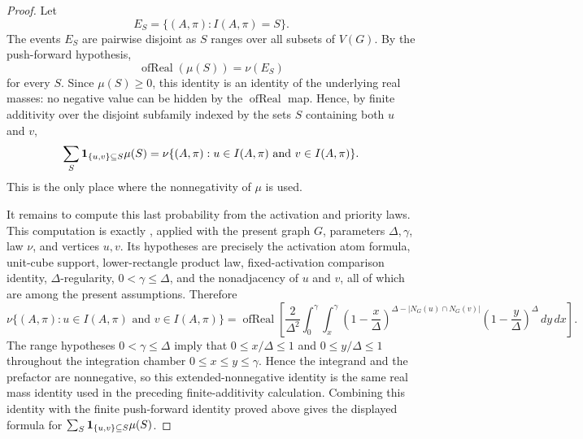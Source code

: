 \begin{proof}
Let
\[
E_S=\{(A,\pi): I(A,\pi)=S\}.
\]
The events \(E_S\) are pairwise disjoint as \(S\) ranges over all subsets of
\(V(G)\).  By the push-forward hypothesis,
\[
\operatorname{ofReal}(\mu(S))=\nu(E_S)
\]
for every \(S\).  Since \(\mu(S)\ge 0\), this identity is an identity of the
underlying real masses: no negative value can be hidden by the
\(\operatorname{ofReal}\) map.  Hence, by finite additivity over the disjoint
subfamily indexed by the sets \(S\) containing both \(u\) and \(v\),
\[
\sum_S {\bf 1}_{\{u,v\}\subseteq S}\mu(S)
=\nu\{(A,\pi):u\in I(A,\pi)\text{ and }v\in I(A,\pi)\}.
\]
This is the only place where the nonnegativity of \(\mu\) is used.

It remains to compute this last probability from the activation and priority
laws.  This computation is exactly
, applied with the present
graph \(G\), parameters \(\Delta,\gamma\), law \(\nu\), and vertices \(u,v\).
Its hypotheses are precisely the activation atom formula, unit-cube support,
lower-rectangle product law, fixed-activation comparison identity,
\(\Delta\)-regularity, \(0<\gamma\le\Delta\), and the nonadjacency of \(u\)
and \(v\), all of which are among the present assumptions.  Therefore
\[
\nu\{(A,\pi):u\in I(A,\pi)\text{ and }v\in I(A,\pi)\}
=
\operatorname{ofReal}\!\left[
\frac{2}{\Delta^2}\int_0^\gamma\int_x^\gamma
\left(1-\frac{x}{\Delta}\right)^{
\Delta-|N_G(u)\cap N_G(v)|}
\left(1-\frac{y}{\Delta}\right)^\Delta\,dy\,dx\right].
\]
The range hypotheses \(0<\gamma\le\Delta\) imply that
\(0\le x/\Delta\le1\) and \(0\le y/\Delta\le1\) throughout the integration
chamber \(0\le x\le y\le\gamma\).  Hence the integrand and the prefactor are
nonnegative, so this extended-nonnegative identity is the same real mass
identity used in the preceding finite-additivity calculation.
Combining this identity with the finite push-forward identity proved above
gives the displayed formula for
\(\sum_S {\bf 1}_{\{u,v\}\subseteq S}\mu(S)\).
\end{proof}
